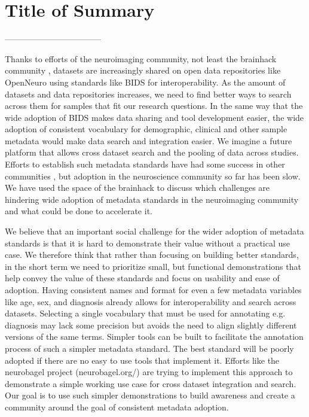 \documentclass[../main.tex]{subfiles}
\begin{document}
\section{Title of Summary}



-----------------------------------

Thanks to efforts of the neuroimaging community, not least the brainhack community \parencite{Gau2021}, datasets are increasingly shared on open data repositories like OpenNeuro \parencite{Markiewicz2021-bf} using standards like BIDS \parencite{Gorgolewski2016-bp} for interoperability. As the amount of datasets and data repositories increases, we need to find better ways to search across them for samples that fit our research questions. In the same way that the wide adoption of BIDS makes data sharing and tool development easier, the wide adoption of consistent vocabulary for demographic, clinical and other sample metadata would make data search and integration easier. We imagine a future platform that allows cross dataset search and the pooling of data across studies. Efforts to establish such metadata standards have had some success in other communities \parencite{Field2008-kw, Stang2010-nl}, but adoption in the neuroscience community so far has been slow. We have used the space of the brainhack to discuss which challenges are hindering wide adoption of metadata standards in the neuroimaging community and what could be done to accelerate it.

We believe that an important social challenge for the wider adoption of metadata standards is that it is hard to demonstrate their value without a practical use case. We therefore think that rather than focusing on building better standards, in the short term we need to prioritize small, but functional demonstrations that help convey the value of these standards and focus on usability and ease of adoption. Having consistent names and format for even a few metadata variables like age, sex, and diagnosis already allows for interoperability and search across datasets. Selecting a single vocabulary that must be used for annotating e.g. diagnosis may lack some precision but avoids the need to align slightly different versions of the same terms. Simpler tools can be built to facilitate the annotation process of such a simpler metadata standard. The best standard will be poorly adopted if there are no easy to use tools that implement it. Efforts like the neurobagel project (neurobagel.org/) are trying to implement this approach to demonstrate a simple working use case for cross dataset integration and search. Our goal is to use such simpler demonstrations to build awareness and create a community around the goal of consistent metadata adoption.
\end{document}
